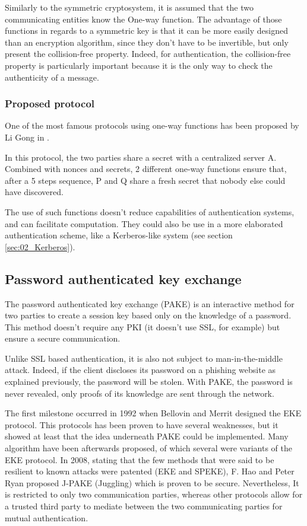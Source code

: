 Similarly to the symmetric cryptosystem, it is assumed that the two communicating entities know the One-way function. The advantage of those functions in regards to a symmetric key is that it can be more easily designed than an encryption algorithm, since they don't have to be invertible, but only present the collision-free property. Indeed, for authentication, the collision-free property is particularly important because it is the only way to check the authenticity of a message.

\subsubsection{Proposed protocol}
One of the most famous protocols using one-way functions has been proposed by Li Gong\cite{Gong1989} in .

In this protocol, the two parties share a secret with a centralized server A. Combined with nonces and secrets, 2 different one-way functions ensure that, after a 5 steps sequence, P and Q share a fresh secret that nobody else could have discovered.

The use of such functions doesn't reduce capabilities of authentication systems, and can facilitate computation. They could also be use in a more elaborated authentication scheme, like a Kerberos-like system (see section \ref{sec:02_Kerberos}).

\subsection{Password authenticated key exchange}
The password authenticated key exchange (PAKE) is an interactive method for two parties to create a session key based only on the knowledge of a password. This method doesn't require any PKI (it doesn't use SSL, for example) but ensure a secure communication.

Unlike SSL based authentication, it is also not subject to man-in-the-middle attack. Indeed, if the client discloses its password on a phishing website as explained previously, the password will be stolen. With PAKE, the password is never revealed, only proofs of its knowledge are sent through the network.

The first milestone occurred in 1992 when Bellovin and Merrit designed the EKE protocol\cite{Bellovin1992}. This protocols has been proven to have several weaknesses, but it showed at least that the idea underneath PAKE could be implemented. Many algorithm have been afterwards proposed, of which several were variants of the EKE protocol. In 2008, stating that the few methods that were said to be resilient to known attacks were patented (EKE\cite{bellovin1993cryptographic} and SPEKE\cite{jablon2001cryptographic}), F. Hao and Peter Ryan proposed J-PAKE (Juggling) which is proven to be secure\cite{hao2010j}\cite{Hao2011}. Nevertheless, It is restricted to only two communication parties, whereas other protocols allow for a trusted third party to mediate between the two communicating parties for mutual authentication\cite{gong1993protecting}\cite{gong1995optimal}.

